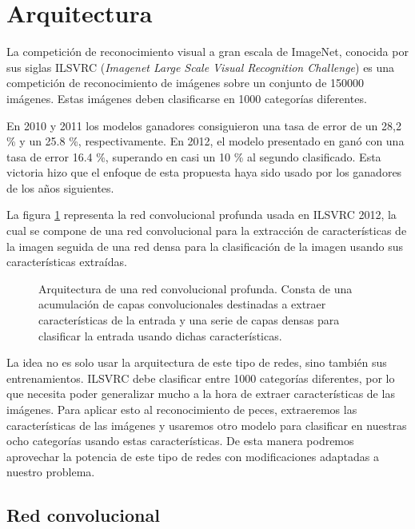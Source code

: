 \section{Arquitectura}

La competición de reconocimiento visual a gran escala de ImageNet, conocida por sus siglas ILSVRC (\textit{Imagenet Large Scale Visual Recognition Challenge}) \parencite{ILSVRC} es una competición de reconocimiento de imágenes sobre un conjunto de 150000 imágenes. Estas imágenes deben clasificarse en 1000 categorías diferentes.

En 2010 y 2011 los modelos ganadores consiguieron una tasa de error de un 28,2 \% y un 25.8 \%, respectivamente. En 2012, el modelo presentado en \parencite{krizhevsky2012imagenet} ganó con una tasa de error 16.4 \%, superando en casi un 10 \% al segundo clasificado. Esta victoria hizo que el enfoque de esta propuesta haya sido usado por los ganadores de los años siguientes.

La figura \ref{general-architecture} representa la red convolucional profunda usada en ILSVRC 2012, la cual se compone de una red convolucional para la extracción de características de la imagen seguida de una red densa para la clasificación de la imagen usando sus características extraídas.

\begin{figure}
  \caption{Arquitectura de una red convolucional profunda. Consta de una acumulación de capas convolucionales destinadas a extraer características de la entrada y una serie de capas densas para clasificar la entrada usando dichas características.}
\label{general-architecture}
\end{figure}

La idea no es solo usar la arquitectura de este tipo de redes, sino también sus entrenamientos. ILSVRC debe clasificar entre 1000 categorías diferentes, por lo que necesita poder generalizar mucho a la hora de extraer características de las imágenes. Para aplicar esto al reconocimiento de peces, extraeremos las características de las imágenes y usaremos otro modelo para clasificar en nuestras ocho categorías usando estas características. De esta manera podremos aprovechar la potencia de este tipo de redes con modificaciones adaptadas a nuestro problema.

\subsection{Red convolucional}

